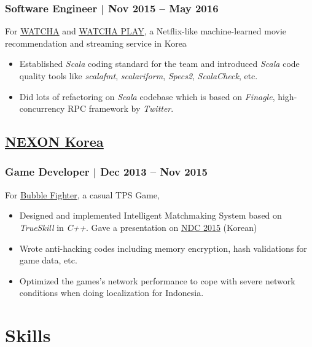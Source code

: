 \documentclass[11pt]{article}
\begin{document}
\subsubsection*{Software Engineer  | Nov 2015 – May 2016}
\label{sec:orgd6a6c2e}
For \uline{\href{https://watcha.net/}{WATCHA}} and \uline{\href{https://play.watcha.net}{WATCHA PLAY}},
a Netflix-like machine-learned movie recommendation and streaming service in Korea

\begin{itemize}[label=$\circ$,itemsep=-0.5ex]
\item Established \emph{Scala} coding standard for the team and introduced \emph{Scala} code quality tools like
\emph{scalafmt}, \emph{scalariform}, \emph{Specs2}, \emph{ScalaCheck}, etc.
\item Did lots of refactoring on \emph{Scala} codebase which is based on \emph{Finagle}, high-concurrency RPC framework by \emph{Twitter}.
\end{itemize}

\subsection*{\underline{\href{http://company.nexon.com/Eng/}{NEXON Korea}}}
\label{sec:org48666f2}
\subsubsection*{Game Developer  | Dec 2013 – Nov 2015}
\label{sec:org42c51fa}
For \uline{\href{http://bf.nexon.com}{Bubble Fighter}}, a casual TPS Game,

\begin{itemize}[label=$\circ$,itemsep=-0.5ex]
\item Designed and implemented Intelligent Matchmaking System based on \emph{TrueSkill} in \emph{C++}.
Gave a presentation on \uline{\href{http://ndcreplay.nexon.com/NDC2015/sessions/NDC2015\_0048.html}{NDC 2015}} (Korean)
\item Wrote anti-hacking codes including memory encryption, hash validations for game data, etc.
\item Optimized the games's network performance to cope with severe network conditions when doing localization for Indonesia.
\end{itemize}

\section*{Skills}
\label{sec:org0424e40}
\vspace{-4ex}
\end{document}
